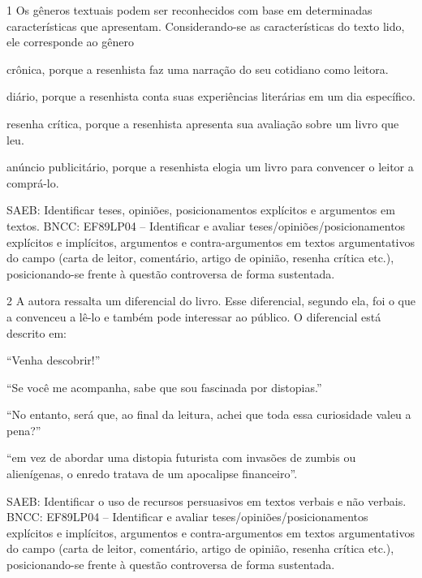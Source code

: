 \num{1} Os gêneros textuais podem ser reconhecidos com base em
determinadas características que apresentam. Considerando-se as
características do texto lido, ele corresponde ao gênero

\begin{escolha}
\item
  crônica, porque a resenhista faz uma narração do seu cotidiano como
  leitora.
\item
  diário, porque a resenhista conta suas experiências literárias em um
  dia específico.
\item
  resenha crítica, porque a resenhista apresenta sua avaliação sobre um
  livro que leu.
\item
  anúncio publicitário, porque a resenhista elogia um livro para
  convencer o leitor a comprá-lo.
\end{escolha}

SAEB: Identificar teses, opiniões, posicionamentos explícitos e
argumentos em textos. BNCC: EF89LP04 -- Identificar e avaliar
teses/opiniões/posicionamentos explícitos e implícitos, argumentos e
contra-argumentos em textos argumentativos do campo (carta de leitor,
comentário, artigo de opinião, resenha crítica etc.), posicionando-se
frente à questão controversa de forma sustentada.

\num{2} A autora ressalta um diferencial do livro. Esse diferencial,
segundo ela, foi o que a convenceu a lê-lo e também pode interessar ao
público. O diferencial está descrito em:

\begin{escolha}
\item ``Venha descobrir!''

\item ``Se você me acompanha, sabe que sou fascinada por distopias.''

\item ``No entanto, será que, ao final da leitura, achei que toda essa
curiosidade valeu a pena?''

\item ``em vez de abordar uma distopia futurista com invasões de zumbis ou
alienígenas, o enredo tratava de um apocalipse financeiro''.
\end{escolha}

SAEB: Identificar o uso de recursos persuasivos em textos verbais e não
verbais. BNCC: EF89LP04 -- Identificar e avaliar
teses/opiniões/posicionamentos explícitos e implícitos, argumentos e
contra-argumentos em textos argumentativos do campo (carta de leitor,
comentário, artigo de opinião, resenha crítica etc.), posicionando-se
frente à questão controversa de forma sustentada.

